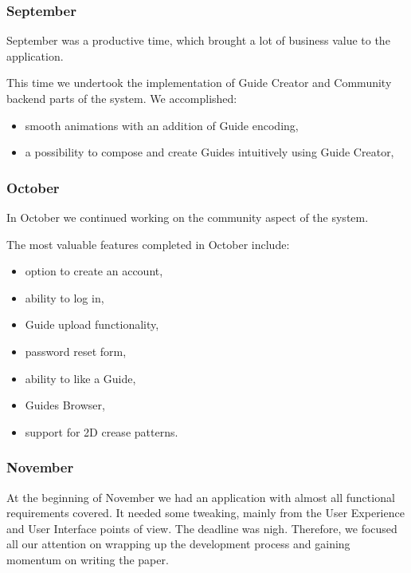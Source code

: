 \subsubsection{September}

September was a productive time, which brought a lot of business value to the application. 

This time we undertook the implementation of Guide Creator and Community backend parts of the system.
\medskip
We accomplished:

\begin{itemize}
	\item smooth animations with an addition of Guide encoding,
	\item a possibility to compose and create Guides intuitively using Guide Creator,
\end{itemize}

\subsubsection{October}

In October we continued working on the community aspect of the system. 

The most valuable features completed in October include:

\begin{itemize}
	\item option to create an account,
	\item ability to log in,
	\item Guide upload functionality,
	\item password reset form,
	\item ability to like a Guide,
	\item Guides Browser,
	\item support for 2D crease patterns.
\end{itemize}


\subsubsection{November}

At the beginning of November we had an application with almost all functional requirements covered. It needed some tweaking, mainly from the User Experience and User Interface points of view. The deadline was nigh. Therefore, we focused all our attention on wrapping up the development process and gaining momentum on writing the paper.

